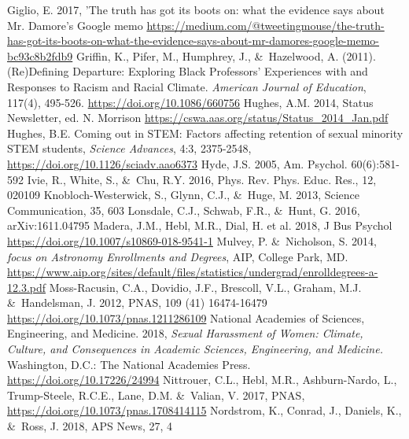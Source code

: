 \documentclass[modern]{aastex62}
\begin{document}
\begin{thebibliography}{}
 Giglio, E. 2017, 'The truth has got its boots on: what the evidence says about Mr. Damore's Google memo \url{https://medium.com/@tweetingmouse/the-truth-has-got-its-boots-on-what-the-evidence-says-about-mr-damores-google-memo-bc93c8b2fdb9}
 Griffin, K., Pifer, M., Humphrey, J., \&\ Hazelwood, A. (2011). (Re)Defining Departure: Exploring Black Professors' Experiences with and Responses to Racism and Racial Climate. {\it American Journal of Education}, 117(4), 495-526. \url{https://doi.org/10.1086/660756}
 Hughes, A.M. 2014, Status Newsletter, ed. N. Morrison \url{https://cswa.aas.org/status/Status_2014_Jan.pdf}
 Hughes, B.E. Coming out in STEM: Factors affecting retention of sexual minority STEM students, {\it Science Advances}, 4:3, 2375-2548, \url{https://doi.org/10.1126/sciadv.aao6373}
 Hyde, J.S. 2005, Am. Psychol. 60(6):581-592
 Ivie, R., White, S., \&\ Chu, R.Y. 2016, Phys. Rev. Phys. Educ. Res., 12, 020109
 Knobloch-Westerwick, S., Glynn, C.J., \&\ Huge, M. 2013, Science Communication, 35, 603
 Lonsdale, C.J., Schwab, F.R., \&\ Hunt, G. 2016, arXiv:1611.04795
 Madera, J.M., Hebl, M.R., Dial, H. et al. 2018, J Bus Psychol \url{https://doi.org/10.1007/s10869-018-9541-1}
 Mulvey, P. \&\ Nicholson, S. 2014, {\it focus on Astronomy Enrollments and Degrees}, AIP, College Park, MD. \url{https://www.aip.org/sites/default/files/statistics/undergrad/enrolldegrees-a-12.3.pdf}
 Moss-Racusin, C.A., Dovidio, J.F., Brescoll, V.L., Graham, M.J. \&\ Handelsman, J. 2012, PNAS, 109 (41) 16474-16479 \url{https://doi.org/10.1073/pnas.1211286109}
 National Academies of Sciences, Engineering, and Medicine. 2018, {\it Sexual Harassment of Women: Climate, Culture, and Consequences in Academic Sciences, Engineering, and Medicine.} Washington, D.C.: The National Academies Press. \url{https://doi.org/10.17226/24994}
 Nittrouer, C.L., Hebl, M.R., Ashburn-Nardo, L., Trump-Steele, R.C.E., Lane, D.M. \&\ Valian, V. 2017, PNAS, \url{https://doi.org/10.1073/pnas.1708414115}
 Nordstrom, K., Conrad, J., Daniels, K., \&\ Ross, J. 2018, APS News, 27, 4

\end{thebibliography}
\end{document}
